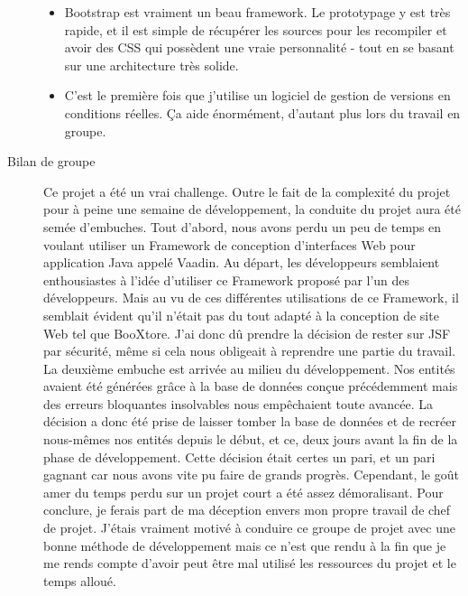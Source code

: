 \begin{description}
\begin{itemize}
			\item Bootstrap est vraiment un beau framework. Le prototypage y est très rapide, et il est simple de récupérer les sources pour les recompiler et avoir des CSS qui possèdent une vraie personnalité - tout en se basant sur une architecture très solide.
			\item C'est le première fois que j'utilise un logiciel de gestion de versions en conditions réelles. Ça aide énormément, d'autant plus lors du travail en groupe.
		\end{itemize}
	\item[Bilan de groupe]
	Ce projet a été un vrai challenge. Outre le fait de la complexité du projet pour à peine une semaine de développement, la conduite du projet aura été semée d’embuches. Tout d’abord, nous avons perdu un peu de temps en voulant utiliser un Framework de conception d’interfaces Web pour application Java appelé Vaadin. Au départ, les développeurs semblaient enthousiastes à l’idée d’utiliser ce Framework proposé par l’un des développeurs. Mais au vu de ces différentes utilisations de ce Framework, il semblait évident qu’il n’était pas du tout adapté à la conception de site Web tel que BooXtore. J’ai donc dû prendre la décision de rester sur JSF par sécurité, même si cela nous obligeait à reprendre une partie du travail. La deuxième embuche est arrivée au milieu du développement. Nos entités avaient été générées grâce à la base de données conçue précédemment mais des erreurs bloquantes insolvables nous empêchaient toute avancée. La décision a donc été prise de laisser tomber la base de données et de recréer nous-mêmes nos entités depuis le début, et ce, deux jours avant la fin de la phase de développement. Cette décision était certes un pari, et un pari gagnant car nous avons vite pu faire de grands progrès. Cependant, le goût amer du temps perdu sur un projet court a été assez démoralisant.
	Pour conclure, je ferais part de ma déception envers mon propre travail de chef de projet. J’étais vraiment motivé à conduire ce groupe de projet avec une bonne méthode de développement mais ce n’est que rendu à la fin que je me rends compte d’avoir peut être mal utilisé les ressources du projet et le temps alloué.

\end{description}
